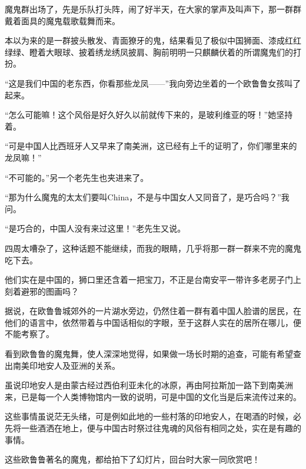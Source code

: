 \par 魔鬼群出场了，先是乐队打头阵，闹了好半天，在大家的掌声及叫声下，那一群群戴着面具的魔鬼载歌载舞而来。
\par 本以为来的是一群披头散发、青面獠牙的鬼，结果看见了极似中国狮面、漆成红红绿绿、瞪着大眼球、披着绣龙绣凤披肩、胸前明明一只麒麟伏着的所谓魔鬼们的打扮。
\par “这是我们中国的老东西，你看那些龙凤——”我向旁边坐着的一个欧鲁鲁女孩叫了起来。
\par “怎么可能嘛！这个风俗是好久好久以前就传下来的，是玻利维亚的呀！”她坚持着。
\par “可是中国人比西班牙人又早来了南美洲，这已经有上千的证明了，你们哪里来的龙凤嘛！”
\par “不可能的。”另一个老先生也夹进来了。
\par “那为什么魔鬼的太太们要叫China，不是与中国女人又同音了，是巧合吗？”我问。
\par “是巧合的，中国人没有来过这里！”老先生又说。
\par 四周太嘈杂了，这种话题不能继续，而我的眼睛，几乎将那一群一群来不完的魔鬼吃下去。
\par 他们实在是中国的，狮口里还含着一把宝刀，不正是台南安平一带许多老房子门上刻着避邪的图画吗？
\par 据说，在欧鲁鲁城郊外的一片湖水旁边，仍然住着一群有着中国人脸谱的居民，在他们的语言中，依然带着与中国话相似的字眼，至于这群人实在的居所在哪儿，便不能考察了。
\par 看到欧鲁鲁的魔鬼舞，使人深深地觉得，如果做一场长时期的追查，可能有希望查出南美印地安人及亚洲的关系。
\par 虽说印地安人是由蒙古经过西伯利亚未化的冰原，再由阿拉斯加一路下到南美洲来，已是每一个人类博物馆内一致的说明，可是中国的文化当是后来流传过来的。
\par 这些事情虽说茫无头绪，可是例如此地的一些村落的印地安人，在喝酒的时候，必先将一些酒洒在地上，便与中国古时祭过往鬼魂的风俗有相同之处，实在是有趣的事情。
\par 这些欧鲁鲁著名的魔鬼，都给拍下了幻灯片，回台时大家一同欣赏吧！
